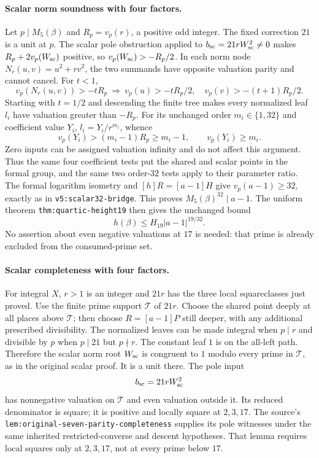 \paragraph{Scalar norm soundness with four factors.}
Let $p\mid M_5(\beta)$ and $R_p=v_p(r)$, a positive odd integer.
The fixed correction $21$ is a unit at $p$. The scalar pole obstruction
applied to $b_{\rm sc}=21rW_{\rm sc}^2\ne0$ makes
$R_p+2v_p(W_{\rm sc})$ positive, so
$v_p(W_{\rm sc})>-R_p/2$.
In each norm node $N_r(u,v)=u^2+rv^2$, the two summands have opposite
valuation parity and cannot cancel. For $t<1$,
\[
 v_p(N_r(u,v))>-tR_p
 \ \Longrightarrow\ 
 v_p(u)>-tR_p/2,\quad v_p(v)>-(t+1)R_p/2.
\]
Starting with $t=1/2$ and descending the finite tree makes every
normalized leaf $l_i$ have valuation greater than $-R_p$.
For its unchanged order $m_i\in\{1,32\}$ and coefficient value $Y_i$,
$l_i=Y_i/r^{m_i}$, whence
\[
 v_p(Y_i)>(m_i-1)R_p\ge m_i-1,
 \qquad v_p(Y_i)\ge m_i.
\]
Zero inputs can be assigned valuation infinity and do not affect this
argument. Thus the same four coefficient tests put the shared and
scalar points in the formal group, and the same two order-$32$ tests
apply to their parameter ratio. The formal logarithm isometry and
$[h]R=[a-1]H$ give $v_p(a-1)\ge32$, exactly as in
\nolinkurl{v5:scalar32-bridge}. This proves
$M_5(\beta)^{32}\mid a-1$. The uniform theorem
\nolinkurl{thm:quartic-height19} then gives the unchanged bound
\[
 h(\beta)\le H_{19}|a-1|^{19/32}.
\]
No assertion about even negative valuations at $17$ is needed: that prime
is already excluded from the consumed-prime set.

\paragraph{Scalar completeness with four factors.}
For integral $X$, $r>1$ is an integer and $21r$ has the three local
squareclasses just proved. Use the finite prime support $\mathcal T$ of
$21r$. Choose the shared point deeply at all places above $\mathcal T$;
then choose $R=[a-1]P$ still deeper, with any additional prescribed
divisibility. The normalized leaves can be made integral when $p\mid r$
and divisible by $p$ when $p\mid21$ but $p\nmid r$.
The constant leaf $1$ is on the all-left path. Therefore the scalar
norm root $W_{\rm sc}$ is congruent to $1$ modulo every prime in
$\mathcal T$, as in the original scalar proof. It is a unit there.
The pole input
\[
 b_{\rm sc}=21rW_{\rm sc}^2
\]
has nonnegative valuation on $\mathcal T$ and even valuation outside it.
Its reduced denominator is square; it is positive and locally square
at $2,3,17$. The source's
\nolinkurl{lem:original-seven-parity-completeness} supplies its pole
witnesses under the same inherited restricted-converse and descent
hypotheses. That lemma requires local squares only at $2,3,17$, not
at every prime below $17$.

